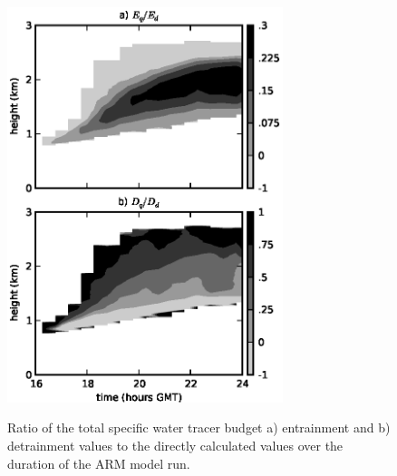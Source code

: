 \documentclass[12pt]{article}
\begin{document}
\begin{figure}[t]
  \noindent
  \includegraphics[width=19pc]{./figures/entrainment_ratio_variability}\\
  \caption{Ratio of the total specific water tracer budget a) 
  entrainment and b) detrainment values to the directly calculated 
  values over the duration of the ARM model run.}
  \label{fig:entrainment_ratio_variability}
\end{figure}
\end{document}
